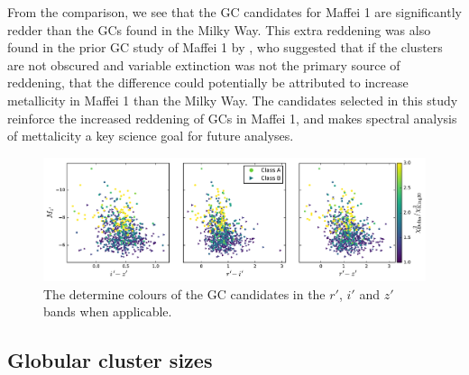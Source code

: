 \documentclass[useAMS,usenatbib]{mn2e}
\begin{document}
 From the comparison, we see that the GC candidates for Maffei 1 are significantly redder than the GCs found in the Milky Way. This extra reddening was also found in the prior GC study of Maffei 1 by \citet{buta03}, who suggested that if the clusters are not obscured and variable extinction was not the primary source of reddening, that the difference could potentially be attributed to increase metallicity in Maffei 1 than the Milky Way. The candidates selected in this study reinforce the increased reddening of GCs in Maffei 1, and makes spectral analysis of mettalicity a key science goal for future analyses.
 
 \begin{figure}
 	\includegraphics[width=\textwidth]{images/colour.pdf}
 	\caption{The determine colours of the GC candidates in the $r'$, $i'$ and $z'$ bands when applicable.}
 	\label{fig:colour}
 \end{figure}
 
 

\subsection{Globular cluster sizes}
\label{sec:gc_sizes}
\end{document}
